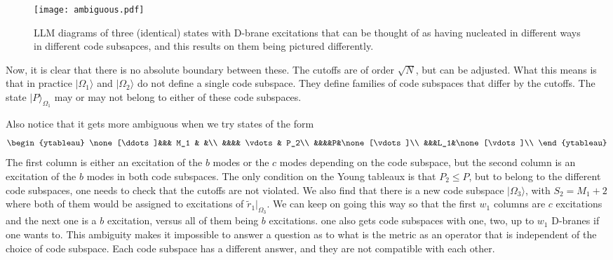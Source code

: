 \documentclass[12pt,nofootinbib, longbibliography]{revtex4-1}
\newcommand\ket[1]{| #1\rangle}
\begin{document}
\begin{figure}[ht]
\texttt{[image: ambiguous.pdf]}
\caption{LLM diagrams of three (identical) states with D-brane excitations that can be thought of as having nucleated in different ways in different code subsapces, and this results on them being pictured differently. }\label{fig:dbrane}
\end{figure}


Now, it is clear that there is no absolute boundary between these. The cutoffs are of order $\sqrt N$, but can be adjusted. What this means is that in practice $\ket {\Omega_1}$ and $\ket{\Omega_2}$ do not define a single code subspace. They define families of code subspaces that differ by the cutoffs. The state $\ket P_{\Omega_1}$ may or may not belong to either of these code subspaces.

Also notice that it gets more ambiguous when we try states of the form
\begin{equation}
\begin{ytableau}
\none[\ddots]&&& M_1 & &\\
&&&& \vdots & P_2\\
&&&&P&\none[\vdots]\\
&&&L_1&\none[\vdots]\\
\end{ytableau}\label{eq:smallstep}
\end{equation}
The first column is either an excitation of the $b$ modes or the $c$ modes depending on the code subspace, but the second column is an excitation of the $b$ modes in both code subspaces. 
The only condition on the Young tableaux is that $P_2\leq P$, but to belong to the different code subspaces, one needs to check that the cutoffs are not violated. We also find that
there is a new code subspace $\ket{\Omega_3}$, with $S_2=M_1+2$ where both of them would be assigned to excitations of $\tilde r_1|_{\Omega_3}$. We can keep on going this way so that the first $w_1$ columns are $c$ excitations and the next one is a $b$ excitation, versus all of them being $b$ excitations. one also gets code subspaces with one, two, up to $w_1$ D-branes if one wants to. 
This ambiguity makes it impossible to answer a question as to what is the metric as an operator that is independent of the choice of code subspace. Each code subspace has a different answer, and they are not compatible with each other.
\end{document}
